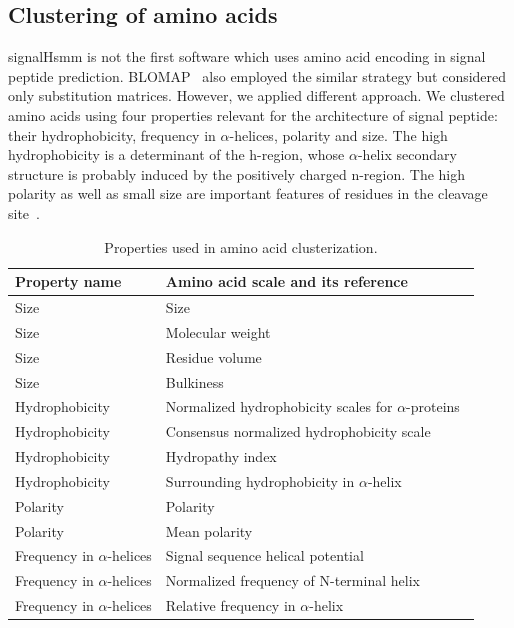 \documentclass[10pt,letterpaper]{article}
\begin{document}
\subsection*{Clustering of amino acids}

signalHsmm is not the first software which uses amino acid encoding in signal peptide prediction. BLOMAP~\cite{maetschke2005blomap} also employed the similar strategy but considered only substitution matrices. However, we applied different approach. We clustered amino acids using four properties relevant for the architecture of signal peptide: their hydrophobicity, frequency in $\alpha$-helices, polarity and size. The high hydrophobicity is a determinant of the h-region, whose $\alpha$-helix secondary structure is probably induced by the positively charged n-region. The high polarity as well as small size are important features of residues in the cleavage site~\cite{1994palzkillselection}.

\begin{table}[ht]
\small
\centering
\caption{Properties used in amino acid clusterization.} 
\begin{tabular}{ll}
  \toprule
Property name & Amino acid scale and its reference \\ 
  \midrule
Size & Size~\cite{dawson1972size} \\ 
   \rowcolor[gray]{0.85}Size & Molecular weight~\cite{fasman1976handbook}\\ 
  Size & Residue volume~\cite{1973goldsackcontribution} \\ 
   \rowcolor[gray]{0.85}Size & Bulkiness~\cite{1968zimmermanthe} \\ 
  Hydrophobicity & Normalized hydrophobicity scales for $\alpha$-proteins~\cite{1992cidhydrophobicity} \\ 
   \rowcolor[gray]{0.85}Hydrophobicity & Consensus normalized hydrophobicity scale~\cite{1984eisenbergthreedimensional} \\ 
  Hydrophobicity & Hydropathy index~\cite{1982kytea} \\ 
   \rowcolor[gray]{0.85}Hydrophobicity & Surrounding hydrophobicity in $\alpha$-helix~\cite{1980ponnuswamyhydrophobic} \\ 
  Polarity & Polarity~\cite{1974granthamamino} \\ 
   \rowcolor[gray]{0.85}Polarity & Mean polarity~\cite{1988radzickainfluences} \\ 
  Frequency in $\alpha$-helices & Signal sequence helical potential~\cite{1982argosstructural} \\ 
   \rowcolor[gray]{0.85}Frequency in $\alpha$-helices & Normalized frequency of N-terminal helix~\cite{chou1978prediction} \\ 
  Frequency in $\alpha$-helices & Relative frequency in $\alpha$-helix~\cite{1990prabhakaranthe} \\ 
   \bottomrule
\end{tabular}
\label{tab:aaprop}
\end{table}
\end{document}
